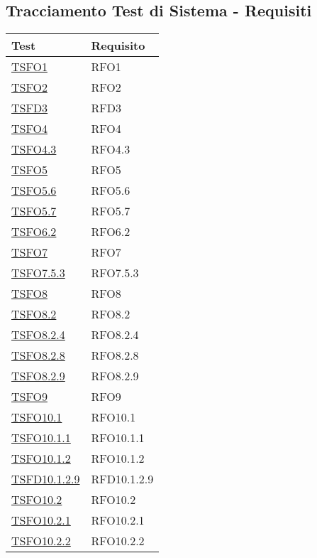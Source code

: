 \subsection{Tracciamento Test di Sistema - Requisiti}

\normalsize
\begin{longtable}{|>{\centering}m{5cm}|m{5cm}<{\centering}|}
	\hline \rowcolor{Gray}
	\textbf{Test} & \textbf{Requisito}\\
	\hline
	\endhead
	\hyperlink{TSFO1}{TSFO1} & RFO1\\ \hline
	\hyperlink{TSFO2}{TSFO2} & RFO2\\ \hline
	\hyperlink{TSFD3}{TSFD3} & RFD3\\ \hline
	\hyperlink{TSFO4}{TSFO4} & RFO4\\ \hline
	\hyperlink{TSFO4.3}{TSFO4.3} & RFO4.3\\ \hline
	\hyperlink{TSFO5}{TSFO5} & RFO5\\ \hline
	\hyperlink{TSFO5.6}{TSFO5.6} & RFO5.6\\ \hline
	\hyperlink{TSFO5.7}{TSFO5.7} & RFO5.7\\ \hline
	\hyperlink{TSFO6.2}{TSFO6.2} & RFO6.2\\ \hline
	\hyperlink{TSFO7}{TSFO7} & RFO7\\ \hline
	\hyperlink{TSFO7.5.3}{TSFO7.5.3} & RFO7.5.3\\ \hline
	\hyperlink{TSFO8}{TSFO8} & RFO8\\ \hline
	\hyperlink{TSFO8.2}{TSFO8.2} & RFO8.2\\ \hline
	\hyperlink{TSFO8.2.4}{TSFO8.2.4} & RFO8.2.4\\ \hline
	\hyperlink{TSFO8.2.8}{TSFO8.2.8} & RFO8.2.8\\ \hline
	\hyperlink{TSFO8.2.9}{TSFO8.2.9} & RFO8.2.9\\ \hline
	\hyperlink{TSFO9}{TSFO9} & RFO9\\ \hline
	\hyperlink{TSFO10.1}{TSFO10.1} & RFO10.1\\ \hline
	\hyperlink{TSFO10.1.1}{TSFO10.1.1} & RFO10.1.1\\ \hline
	\hyperlink{TSFO10.1.2}{TSFO10.1.2} & RFO10.1.2\\ \hline
	\hyperlink{TSFD10.1.2.9}{TSFD10.1.2.9} & RFD10.1.2.9\\ \hline
	\hyperlink{TSFO10.2}{TSFO10.2} & RFO10.2\\ \hline
	\hyperlink{TSFO10.2.1}{TSFO10.2.1} & RFO10.2.1\\ \hline
	\hyperlink{TSFO10.2.2}{TSFO10.2.2} & RFO10.2.2\\ \hline

\end{longtable}
